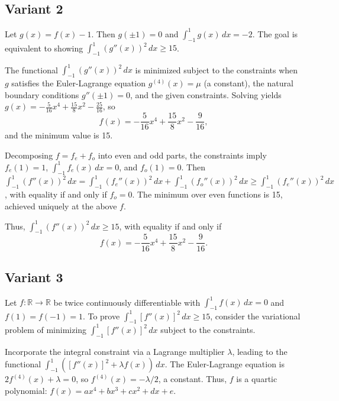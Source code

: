 \documentclass[12pt,a4paper]{article}
\theoremstyle{definition}
\begin{document}
\subsection{Variant 2}
    Let $g(x) = f(x) - 1$. Then $g(\pm 1) = 0$ and $\int_{-1}^{1} g(x) \, dx = -2$. The goal is equivalent to showing $\int_{-1}^{1} (g''(x))^2 \, dx \geq 15$.

    The functional $\int_{-1}^{1} (g''(x))^2 \, dx$ is minimized subject to the constraints when $g$ satisfies the Euler-Lagrange equation $g^{(4)}(x) = \mu$ (a constant), the natural boundary conditions $g''(\pm 1) = 0$, and the given constraints. Solving yields $g(x) = -\frac{5}{16} x^4 + \frac{15}{8} x^2 - \frac{25}{16}$, so
    \[
        f(x) = -\frac{5}{16} x^4 + \frac{15}{8} x^2 - \frac{9}{16},
    \]
    and the minimum value is 15.

    Decomposing $f = f_e + f_o$ into even and odd parts, the constraints imply $f_e(1) = 1$, $\int_{-1}^{1} f_e(x) \, dx = 0$, and $f_o(1) = 0$. Then $\int_{-1}^{1} (f''(x))^2 \, dx = \int_{-1}^{1} (f_e''(x))^2 \, dx + \int_{-1}^{1} (f_o''(x))^2 \, dx \geq \int_{-1}^{1} (f_e''(x))^2 \, dx$, with equality if and only if $f_o = 0$. The minimum over even functions is 15, achieved uniquely at the above $f$.

    Thus, $\int_{-1}^{1} (f''(x))^2 \, dx \geq 15$, with equality if and only if
    \[
        f(x) = -\frac{5}{16} x^4 + \frac{15}{8} x^2 - \frac{9}{16}.
    \]

\subsection{Variant 3}
    Let $f: \mathbb{R} \to \mathbb{R}$ be twice continuously differentiable with $\int_{-1}^{1} f(x) \, dx = 0$ and $f(1) = f(-1) = 1$. To prove $\int_{-1}^{1} [f''(x)]^2 \, dx \geq 15$, consider the variational problem of minimizing $\int_{-1}^{1} [f''(x)]^2 \, dx$ subject to the constraints.

    Incorporate the integral constraint via a Lagrange multiplier $\lambda$, leading to the functional $\int_{-1}^{1} ([f''(x)]^2 + \lambda f(x)) \, dx$. The Euler-Lagrange equation is $2 f^{(4)}(x) + \lambda = 0$, so $f^{(4)}(x) = -\lambda/2$, a constant. Thus, $f$ is a quartic polynomial: $f(x) = a x^4 + b x^3 + c x^2 + d x + e$.
\end{document}
